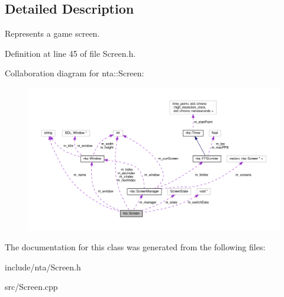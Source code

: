 \subsection{Detailed Description}
Represents a game screen. 

Definition at line 45 of file Screen.\+h.



Collaboration diagram for nta\+:\+:Screen\+:
\nopagebreak
\begin{figure}[H]
\begin{center}
\leavevmode
\includegraphics[width=350pt]{d4/df6/classnta_1_1Screen__coll__graph}
\end{center}
\end{figure}


The documentation for this class was generated from the following files\+:\begin{DoxyCompactItemize}
\item 
include/nta/Screen.\+h\item 
src/Screen.\+cpp\end{DoxyCompactItemize}
